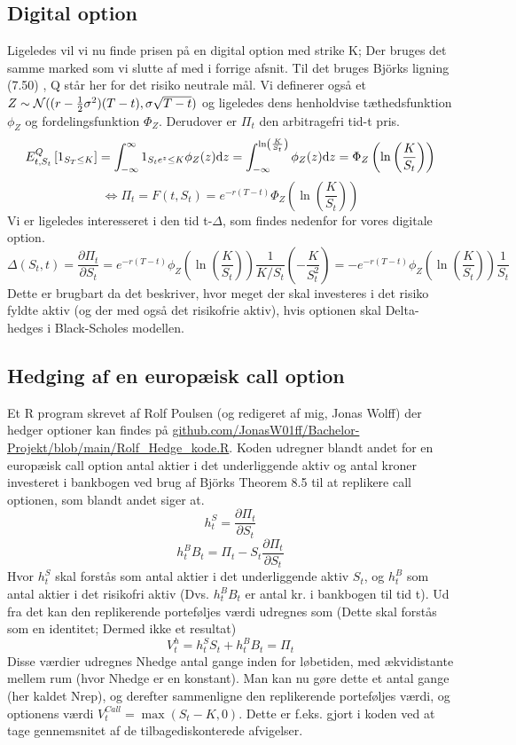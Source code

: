 \documentclass{article}
\theoremstyle{definition}
\theoremstyle{remark}
\newcommand\ens{\Leftrightarrow}
\begin{document}
\subsection{Digital option}
Ligeledes vil vi nu finde prisen på en digital option \color{red}med strike K; Der bruges det samme marked som vi slutte af med i forrige afsnit\color{black}. Til det bruges Björks ligning (7.50) \cite{Bjork2020}, Q står her for det risiko neutrale mål. Vi definerer også et $\\Z\sim\mathcal N((r-\frac12\sigma^2)(T-t),\sigma\sqrt{T-t})$ og ligeledes dens henholdvise tæthedsfunktion $\phi_Z$ og fordelingsfunktion $\Phi_Z$. Derudover er $\Pi_t$ den arbitragefri tid-t pris. 
$$E^Q_{t,S_t}\left[1_{S_T\leq K}\right]=\int_{-\infty}^{\infty}1_{S_te^{z}\leq K}\phi_Z(z)\text dz=\int_{-\infty}^{\ln\left(\frac K{S_t}\right)}\phi_Z(z)\text d z=\Phi_Z\left(\ln\left(\frac{K}{S_t}\right)\right)$$
$$\ens \Pi_t=F(t,S_t)=e^{-r(T-t)}\Phi_Z\left(\ln\left(\frac{K}{S_t}\right)\right)$$
Vi er ligeledes interesseret i den tid t-$\Delta$, som findes nedenfor for vores digitale option.
$$\Delta(S_t,t)=\frac{\partial \Pi_t}{\partial S_t}=e^{-r(T-t)}\phi_Z\left(\ln\left(\frac{K}{S_t}\right)\right)\frac{1}{K/S_t}\left(-\frac{K}{S_t^2}\right)=-e^{-r(T-t)}\phi_Z\left(\ln\left(\frac{K}{S_t}\right)\right)\frac{1}{S_t}$$
Dette er brugbart da det beskriver, hvor meget der skal investeres i det risiko fyldte aktiv (og der med også det risikofrie aktiv), hvis optionen skal Delta-hedges i Black-Scholes modellen.
\subsection{Hedging af en europæisk call option}
Et R program skrevet af Rolf Poulsen (og redigeret af mig, Jonas Wolff) der hedger optioner kan findes på \href{https://github.com/JonasW01ff/Bachelor-Projekt/blob/main/Rolf_Hedge_kode.R}{github.com/JonasW01ff/Bachelor-Projekt/blob/main/Rolf\_Hedge\_kode.R}. Koden udregner blandt andet for en europæisk call option antal aktier i det underliggende aktiv og antal kroner investeret i bankbogen ved brug af Björks Theorem 8.5 \cite{Bjork2020} til at replikere call optionen, som blandt andet siger at.
$$h^S_t=\frac{\partial \Pi_t}{\partial S_t}$$
$$h^B_tB_t=\Pi_t-S_t\frac{\partial \Pi_t}{\partial S_t}$$
Hvor $h^S_t$ skal forstås som antal aktier i det underliggende aktiv $S_t$, og $h^B_t$ som antal aktier i det risikofri aktiv (Dvs. $h^B_tB_t$ er antal kr. i bankbogen til tid t). Ud fra det kan den replikerende porteføljes værdi udregnes som \color{red}(Dette skal forstås som en identitet; Dermed ikke et resultat)\color{black}
$$V^h_t=h^S_tS_t+h^B_tB_t=\Pi_t$$
Disse værdier udregnes Nhedge antal gange inden for løbetiden, med ækvidistante mellem rum (hvor Nhedge er en konstant). Man kan nu gøre dette et antal gange (her kaldet Nrep), og derefter sammenligne den replikerende porteføljes værdi, og optionens værdi $V^{Call}_t=\max(S_t-K,0)$. Dette er f.eks. gjort i koden ved at tage gennemsnitet af de tilbagediskonterede afvigelser. 
\end{document}
